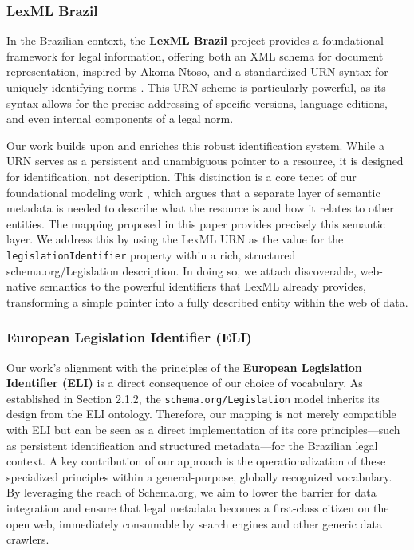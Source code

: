 \documentclass[11pt]{article}
\begin{document}
\subsubsection{LexML Brazil}

In the Brazilian context, the \textbf{LexML Brazil} project provides a foundational framework for legal information, offering both an XML schema for document representation, inspired by Akoma Ntoso, and a standardized URN syntax for uniquely identifying norms \cite{lexml2008modelo}. This URN scheme is particularly powerful, as its syntax allows for the precise addressing of specific versions, language editions, and even internal components of a legal norm.

Our work builds upon and enriches this robust identification system. While a URN serves as a persistent and unambiguous pointer to a resource, it is designed for identification, not description. This distinction is a core tenet of our foundational modeling work \cite{demartim2025temporal}, which argues that a separate layer of semantic metadata is needed to describe what the resource is and how it relates to other entities. The mapping proposed in this paper provides precisely this semantic layer. We address this by using the LexML URN as the value for the \texttt{legislationIdentifier} property within a rich, structured schema.org/Legislation description. In doing so, we attach discoverable, web-native semantics to the powerful identifiers that LexML already provides, transforming a simple pointer into a fully described entity within the web of data.

\subsubsection{European Legislation Identifier (ELI)}

Our work's alignment with the principles of the \textbf{European Legislation Identifier (ELI)} \cite{eli-guide} is a direct consequence of our choice of vocabulary. As established in Section 2.1.2, the \texttt{schema.org/Legislation} model inherits its design from the ELI ontology. Therefore, our mapping is not merely compatible with ELI but can be seen as a direct implementation of its core principles—such as persistent identification and structured metadata—for the Brazilian legal context. A key contribution of our approach is the operationalization of these specialized principles within a general-purpose, globally recognized vocabulary. By leveraging the reach of Schema.org, we aim to lower the barrier for data integration and ensure that legal metadata becomes a first-class citizen on the open web, immediately consumable by search engines and other generic data crawlers.
\end{document}
